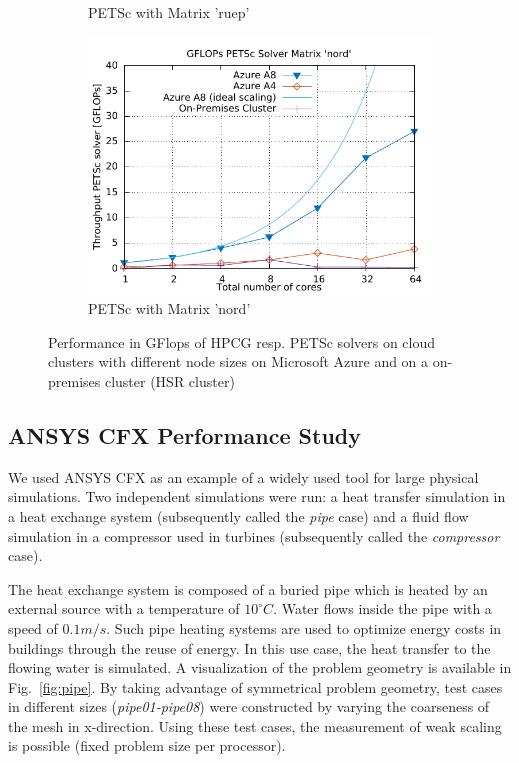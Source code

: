 \documentclass[3p,times]{elsarticle}
\begin{document}
\begin{figure}[h]
\begin{subfigure}{.33\textwidth}
	\caption{PETSc with Matrix 'ruep'}
  \label{fig:ruep}
\end{subfigure}%
\begin{subfigure}{.33\textwidth}
  \centering
  \includegraphics[width=\linewidth]{gplt-gflops-nord}
	\caption{PETSc with Matrix 'nord'}
  \label{fig:nord}
\end{subfigure}

\caption{Performance in GFlops of HPCG resp. PETSc solvers on cloud clusters with different node sizes on Microsoft Azure and on a on-premises cluster (HSR cluster) }
\label{fig:test}
\end{figure}


 

\subsection{ANSYS CFX Performance Study}
We used ANSYS CFX as an example of a widely used tool for large physical simulations.
Two independent simulations were run: a heat transfer simulation in a heat exchange system (subsequently called the \textit{pipe} case) and a fluid flow simulation in a compressor used in turbines (subsequently called the \textit{compressor} case).

The heat exchange system is composed of a buried pipe which is heated by an external source with a temperature of  $10 ^\circ C$. Water flows inside the pipe with a speed of $0.1m/s$. Such pipe heating systems are used to optimize energy costs in buildings through the reuse of energy. In this use case, the heat transfer to the flowing water is simulated. A visualization of the problem geometry is available in Fig.~\ref{fig:pipe}. By taking advantage of symmetrical problem geometry, test cases in different sizes (\textit{pipe01-pipe08}) were constructed by varying the coarseness of the mesh in x-direction. Using these test cases, the measurement of weak scaling is possible (fixed problem size per processor).
\end{document}
